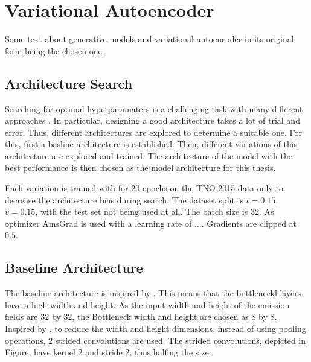 
\chapter{Variational Autoencoder}\label{chapter:vae}

Some text about generative models and variational autoencoder \parencite{VAE} in its original form being the chosen one.

\section{Architecture Search}
Searching for optimal hyperparamaters is a challenging task with many different approaches \parencite{HyperParameters}.
In particular, designing a good architecture takes a lot of trial and error.
Thus, different architectures are explored to determine a suitable one.
For this, first a basline architecture is established.
Then, different variations of this architecture are explored and trained.
The architecture of the model with the best performance is then chosen as the model architecture for this thesis.

Each variation is trained with for $20$ epochs on the TNO 2015 data only to decrease the architecture bias during search.
The dataset split is $t=0.15$, $v=0.15$, with the test set not being used at all.
The batch size is $32$.
As optimizer AmsGrad \parencite{AmsGrad} is used with a learning rate of $\dots$.
Gradients are clipped at $0.5$.

\section{Baseline Architecture}
The baseline architecture is inspired by \parencite{Tightrope}.
This means that the bottleneckl layers have a high width and height.
As the input width and height of the emission fields are $32$ by $32$, the Bottleneck width and height are chosen as $8$ by $8$.
Inspired by \parencite{AllConvolutional} , to reduce the width and height dimensions, instead of using pooling operations, $2$ strided convolutions are used.
The strided convolutions, depicted in Figure, have kernel 2 and stride 2, thus halfing the size.

